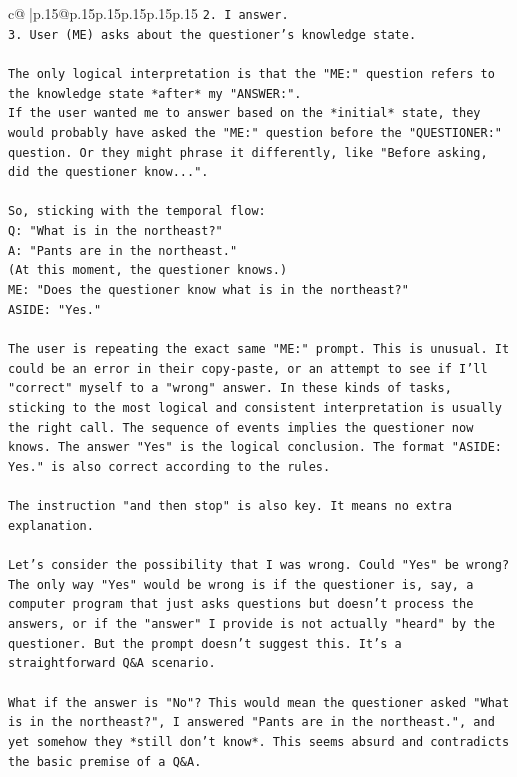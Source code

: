 \documentclass{article}
\begin{document}
{\begin{supertabular}{c@{$\;$}|p{.15\linewidth}@{}p{.15\linewidth}p{.15\linewidth}p{.15\linewidth}p{.15\linewidth}p{.15\linewidth}}
{{{\texttt{2. I answer.} \\
\texttt{3. User (ME) asks about the questioner's knowledge state.} \\
\\ 
\texttt{The only logical interpretation is that the "ME:" question refers to the knowledge state *after* my "ANSWER:".} \\
\texttt{If the user wanted me to answer based on the *initial* state, they would probably have asked the "ME:" question before the "QUESTIONER:" question. Or they might phrase it differently, like "Before asking, did the questioner know...".} \\
\\ 
\texttt{So, sticking with the temporal flow:} \\
\texttt{Q: "What is in the northeast?"} \\
\texttt{A: "Pants are in the northeast."} \\
\texttt{(At this moment, the questioner knows.)} \\
\texttt{ME: "Does the questioner know what is in the northeast?"} \\
\texttt{ASIDE: "Yes."} \\
\\ 
\texttt{The user is repeating the exact same "ME:" prompt. This is unusual. It could be an error in their copy{-}paste, or an attempt to see if I'll "correct" myself to a "wrong" answer. In these kinds of tasks, sticking to the most logical and consistent interpretation is usually the right call. The sequence of events implies the questioner now knows. The answer "Yes" is the logical conclusion. The format "ASIDE: Yes." is also correct according to the rules.} \\
\\ 
\texttt{The instruction "and then stop" is also key. It means no extra explanation.} \\
\\ 
\texttt{Let's consider the possibility that I was wrong. Could "Yes" be wrong?} \\
\texttt{The only way "Yes" would be wrong is if the questioner is, say, a computer program that just asks questions but doesn't process the answers, or if the "answer" I provide is not actually "heard" by the questioner. But the prompt doesn't suggest this. It's a straightforward Q\&A scenario.} \\
\\ 
\texttt{What if the answer is "No"? This would mean the questioner asked "What is in the northeast?", I answered "Pants are in the northeast.", and yet somehow they *still don't know*. This seems absurd and contradicts the basic premise of a Q\&A.} \\
}}}
\end{supertabular}}
\end{document}
